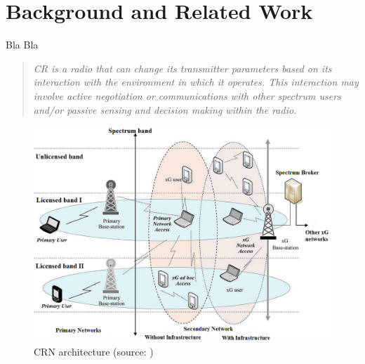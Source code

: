\chapter{Background and Related Work}
\label{sec:previousworks}
Bla Bla

\begin{quotation}
\textit{CR is a radio that can change its transmitter parameters based on its interaction with the environment in which it operates. This interaction may involve active negotiation or communications with other spectrum users and/or passive sensing and decision making within the radio.}
\end{quotation}

\begin{figure}[!htb]
\begin{center}
	\includegraphics[scale=0.6]{figures/Cognitive-radio-system.png}
	\caption{CRN architecture (source: \cite{r63})}
	\label{CRNsys}
\end{center}
\vspace{-5mm}
\end{figure}



